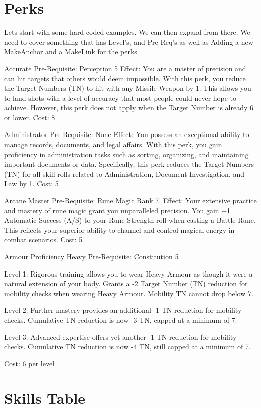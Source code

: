 \documentclass[12pt]{article}
\begin{document}
\section{Perks}

Lets start with some hard coded examples. We can then expand from there.
We need to cover something that has Level's, and Pre-Req's as well as Adding a new MakeAnchor and a MakeLink for the perks

Accurate
Pre-Requisite: Perception 5
Effect: You are a master of precision and can hit targets that others would deem impossible. With this perk, you reduce the Target Numbers (TN) to hit with any Missile Weapon by 1. This allows you to land shots with a level of accuracy that most people could never hope to achieve. However, this perk does not apply when the Target Number is already 6 or lower.
Cost: 8

Administrator
Pre-Requisite: None
Effect: You possess an exceptional ability to manage records, documents, and legal affairs. With this perk, you gain proficiency in administration tasks such as sorting, organizing, and maintaining important documents or data. Specifically, this perk reduces the Target Numbers (TN) for all skill rolls related to Administration, Document Investigation, and Law by 1.
Cost: 5

Arcane Master
Pre-Requisite: Rune Magic Rank 7.
Effect: Your extensive practice and mastery of rune magic grant you unparalleled precision. You gain +1 Automatic Success (A/S) to your Rune Strength roll when casting a Battle Rune. This reflects your superior ability to channel and control magical energy in combat scenarios. 
Cost: 5

Armour Proficiency Heavy
Pre-Requisite: Constitution 5

Level 1: Rigorous training allows you to wear Heavy Armour as though it were a natural extension of your body. Grants a -2 Target Number (TN) reduction for mobility checks when wearing Heavy Armour. Mobility TN cannot drop below 7.

Level 2: Further mastery provides an additional -1 TN reduction for mobility checks. Cumulative TN reduction is now -3 TN, capped at a minimum of 7.

Level 3: Advanced expertise offers yet another -1 TN reduction for mobility checks. Cumulative TN reduction is now -4 TN, still capped at a minimum of 7.

Cost: 6 per level 


\newpage
\section{Skills Table}
\end{document}
